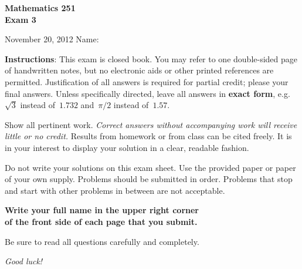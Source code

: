 \documentclass[11pt]{exam}
\begin{document}
\addpoints

\noindent
\textbf{{\large Mathematics 251 \\ Exam 3}}

\noindent
November 20, 2012  \hfill Name: \underline{\hspace{3in}}


\noindent \textbf{Instructions}: This exam is closed book. You may refer to one
double-sided page of handwritten notes, but no electronic aids or other
printed references are permitted. Justification of all answers is required
for partial credit; please  your final answers. Unless
specifically directed, leave all answers in \textbf{exact form}, e.g.
$\sqrt{3}$ instead of~$1.732$ and~$\pi/2$ instead of~$1.57$.

Show all pertinent work. \emph{Correct answers without accompanying work will
receive little or no credit.} Results from homework or from class can be cited freely. It is in your interest to display your solution in
a clear, readable fashion.

Do not write your solutions on this exam sheet. Use the provided paper or paper of your own supply. Problems should be submitted in order. Problems that stop and start with other problems in between are not acceptable.

\begin{center}
\textbf{Write your full name in the upper right corner \\ of the front side of each page that you submit.} 


Be sure to read all questions carefully and completely.


{\Large \emph{Good luck!}}
\end{center}




\begin{center}
\combinedgradetable[h]
\end{center}
\end{document}
